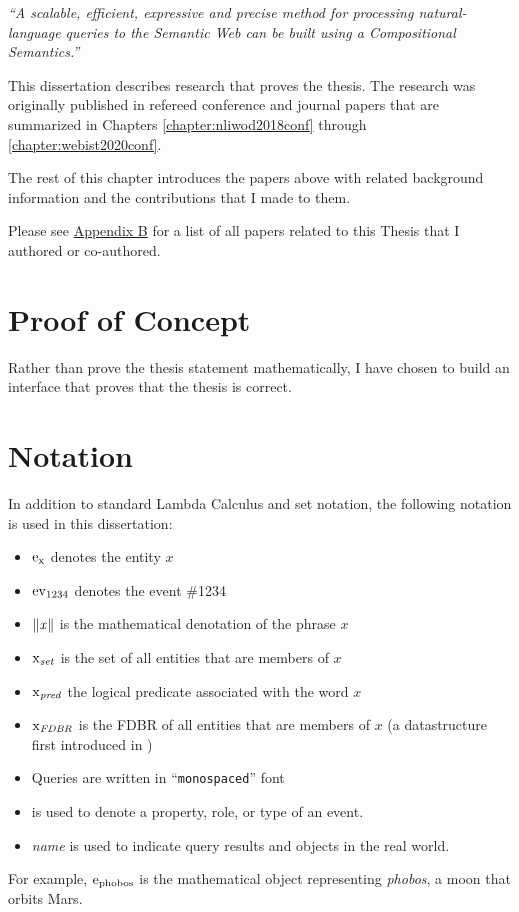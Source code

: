 \documentclass[../main.tex]{subfiles}
\begin{document}
\begin{refsection}
\textit{``A scalable, efficient, expressive and precise method for processing natural-language queries to the Semantic Web can be built using a Compositional Semantics.''}

This dissertation describes research that proves the thesis. The research was originally published in refereed conference and journal papers that are summarized in Chapters \ref{chapter:nliwod2018conf} through \ref{chapter:webist2020conf}.

The rest of this chapter introduces the papers above with related background information and the contributions that I made to them. %

Please see \hyperref[appendix:b]{Appendix B} for a list of all papers related to this Thesis that I authored or co-authored. \cite{peelar2016accommodating}

\section{Proof of Concept}

Rather than prove the thesis statement mathematically, I have chosen to build an interface that
proves that the thesis is correct.

\section{Notation}

In addition to standard Lambda Calculus and set notation, the following notation is used in this dissertation:
\begin{itemize}
    \item $\mathrm{e}_{\operatorname{x}}$ denotes the entity $x$
    \item $\operatorname{ev}_{1234}$ denotes the event \#1234
    \item $\lVert\textit{x\hspace{0.1em}}\rVert$ is the mathematical denotation of the phrase $x$
    \item $\operatorname{x}_{\operatorname{\mathit{set}}}$ is the set of all entities that are members of $x$
    \item $\operatorname{x}_{\operatorname{\mathit{pred}}}$ the logical predicate associated with the word $x$
    \item $\operatorname{x}_{\operatorname{\mathit{FDBR}}}$ is the FDBR of all entities that are members of $x$ (a datastructure first introduced in )
    \item Queries are written in ``\texttt{monospaced}'' font
    \item {} is used to denote a property, role, or type of an event.
    \item \textit{name} is used to indicate query results and objects in the real world.
\end{itemize}
For example, $\mathrm{e}_{\operatorname{phobos}}$ is the mathematical object representing \textit{phobos}, a moon that orbits Mars.


\end{refsection}
\end{document}

